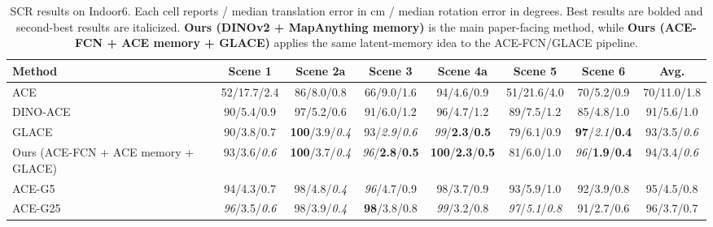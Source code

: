 \begin{table}[t]
\centering
\footnotesize
\setlength{\tabcolsep}{1.7pt}
\renewcommand{\arraystretch}{1.08}
\caption{SCR results on Indoor6. Each cell reports \acctwentyfive{} / median translation error in cm / median rotation error in degrees. Best results are bolded and second-best results are italicized. \textbf{Ours (DINOv2 + MapAnything memory)} is the main paper-facing method, while \textbf{Ours (ACE-FCN + ACE memory + GLACE)} applies the same latent-memory idea to the ACE-FCN/GLACE pipeline.}
\label{tab:indoor6_main_comparison}
\providecommand{\best}[1]{\textbf{#1}}
\providecommand{\second}[1]{\textit{#1}}
\providecommand{\cellres}[3]{#1/#2/#3}
\begin{tabular*}{\textwidth}{@{\extracolsep{\fill}}lccccccc@{}}
\toprule
Method
& Scene 1
& Scene 2a
& Scene 3
& Scene 4a
& Scene 5
& Scene 6
& Avg. \\
\midrule
ACE
& \cellres{52}{17.7}{2.4}
& \cellres{86}{8.0}{0.8}
& \cellres{66}{9.0}{1.6}
& \cellres{94}{4.6}{0.9}
& \cellres{51}{21.6}{4.0}
& \cellres{70}{5.2}{0.9}
& \cellres{70}{11.0}{1.8} \\
DINO-ACE
& \cellres{90}{5.4}{0.9}
& \cellres{97}{5.2}{0.6}
& \cellres{91}{6.0}{1.2}
& \cellres{96}{4.7}{1.2}
& \cellres{89}{7.5}{1.2}
& \cellres{85}{4.8}{1.0}
& \cellres{91}{5.6}{1.0} \\
GLACE
& \cellres{90}{3.8}{0.7}
& \cellres{\best{100}}{3.9}{\second{0.4}}
& \cellres{93}{\second{2.9}}{\second{0.6}}
& \cellres{\second{99}}{\best{2.3}}{\best{0.5}}
& \cellres{79}{6.1}{0.9}
& \cellres{\best{97}}{\second{2.1}}{\best{0.4}}
& \cellres{93}{3.5}{\second{0.6}} \\
Ours (ACE-FCN + ACE memory + GLACE)
& \cellres{93}{3.6}{\second{0.6}}
& \cellres{\best{100}}{3.7}{\second{0.4}}
& \cellres{\second{96}}{\best{2.8}}{\best{0.5}}
& \cellres{\best{100}}{\best{2.3}}{\best{0.5}}
& \cellres{81}{6.0}{1.0}
& \cellres{\second{96}}{\best{1.9}}{\best{0.4}}
& \cellres{94}{3.4}{\second{0.6}} \\
ACE-G5
& \cellres{94}{4.3}{0.7}
& \cellres{98}{4.8}{\second{0.4}}
& \cellres{\second{96}}{4.7}{0.9}
& \cellres{98}{3.7}{0.9}
& \cellres{93}{5.9}{1.0}
& \cellres{92}{3.9}{0.8}
& \cellres{95}{4.5}{0.8} \\
ACE-G25
& \cellres{\second{96}}{3.5}{\second{0.6}}
& \cellres{98}{3.9}{\second{0.4}}
& \cellres{\best{98}}{3.8}{0.8}
& \cellres{\second{99}}{3.2}{0.8}
& \cellres{\second{97}}{\second{5.1}}{\second{0.8}}
& \cellres{91}{2.7}{0.6}
& \cellres{96}{3.7}{0.7} \\

\end{tabular*}
\end{table}
